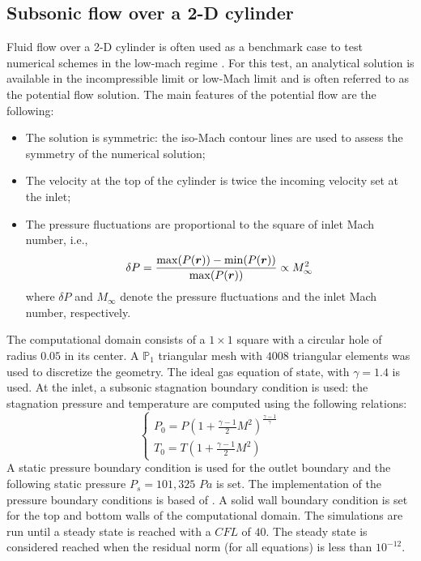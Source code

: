 \subsection{Subsonic flow over a 2-D cylinder} \label{sec:cylinder}
Fluid flow over a 2-D cylinder is often used as a benchmark case to test numerical schemes in the low-mach regime \cite{LowMach1, LowMach2, LowMach3}. For this test, an analytical solution is available in the incompressible limit or low-Mach limit and is often referred to as the potential flow solution. The main features of the potential flow are the following:
%
\begin{itemize}
\item The solution is symmetric: the iso-Mach contour lines are used to assess the symmetry of the numerical solution;
\item The velocity at the top of the cylinder is twice the incoming velocity set at the inlet;
\item The pressure fluctuations are proportional to the square of inlet Mach number, i.e., 
\begin{equation}
\delta P = \frac{\max(P(\boldsymbol r)) - \min(P(\boldsymbol r))}{\max(P(\boldsymbol r))}  \propto M_\infty^2
\end{equation}
where $\delta P$ and $M_\infty$ denote the pressure fluctuations and the inlet Mach number, respectively.
\end{itemize}
%
The computational domain consists of a $1\times 1$ square with a circular hole of radius $0.05$ in its center. A $\mathbb{P}_1$ triangular mesh with $4008$ triangular elements was used to discretize the geometry. The ideal gas equation of state, with $\gamma=1.4$ is used. At the inlet, a subsonic stagnation boundary condition is used: the stagnation pressure and temperature are computed using the following relations:
%
\begin{equation}
\label{eq:stagnation_relations}
\left\{
\begin{array}{l}
P_0 = P\left( 1 + \frac{\gamma-1}{2} M^2 \right)^{\frac{\gamma-1}{\gamma}} \\
T_0 = T\left( 1 + \frac{\gamma-1}{2} M^2 \right)
\end{array}
\right.
\end{equation}
%
A static pressure boundary condition is used for the outlet boundary and the following static pressure $P_s = 101,325$ $Pa$ is set. The implementation of the pressure boundary conditions is based of \cite{SEM}. A solid wall boundary condition is set for the top and bottom walls of the computational domain. The simulations are run until a steady state is reached with a $CFL$ of $40$. The steady state is considered reached when the residual norm  (for all equations) is less than $10^{-12}$.

